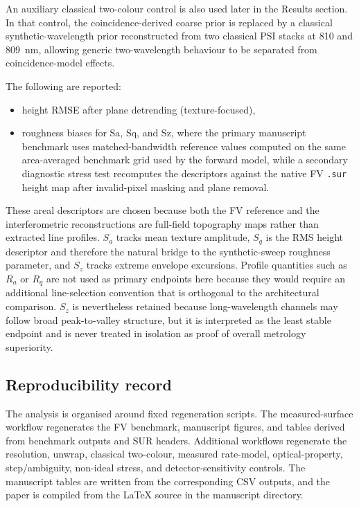 \documentclass[photonics,article,submit,pdftex,moreauthors]{Definitions/mdpi}
\begin{document}
An auxiliary classical two-colour control is also used later in the Results section. In that control, the coincidence-derived coarse prior is replaced by a classical synthetic-wavelength prior reconstructed from two classical PSI stacks at 810 and 809~nm, allowing generic two-wavelength behaviour to be separated from coincidence-model effects.

The following are reported:
\begin{itemize}
\item height RMSE after plane detrending (texture-focused),
\item roughness biases for Sa, Sq, and Sz, where the primary manuscript benchmark uses matched-bandwidth reference values computed on the same area-averaged benchmark grid used by the forward model, while a secondary diagnostic stress test recomputes the descriptors against the native FV \texttt{.sur} height map after invalid-pixel masking and plane removal.
\end{itemize}

These areal descriptors are chosen because both the FV reference and the interferometric reconstructions are full-field topography maps rather than extracted line profiles. $S_a$ tracks mean texture amplitude, $S_q$ is the RMS height descriptor and therefore the natural bridge to the synthetic-sweep roughness parameter, and $S_z$ tracks extreme envelope excursions. Profile quantities such as $R_a$ or $R_q$ are not used as primary endpoints here because they would require an additional line-selection convention that is orthogonal to the architectural comparison. $S_z$ is nevertheless retained because long-wavelength channels may follow broad peak-to-valley structure, but it is interpreted as the least stable endpoint and is never treated in isolation as proof of overall metrology superiority.

\subsection{Reproducibility record}
The analysis is organised around fixed regeneration scripts. The measured-surface workflow regenerates the FV benchmark, manuscript figures, and tables derived from benchmark outputs and SUR headers. Additional workflows regenerate the resolution, unwrap, classical two-colour, measured rate-model, optical-property, step/ambiguity, non-ideal stress, and detector-sensitivity controls. The manuscript tables are written from the corresponding CSV outputs, and the paper is compiled from the LaTeX source in the manuscript directory.
\end{document}
